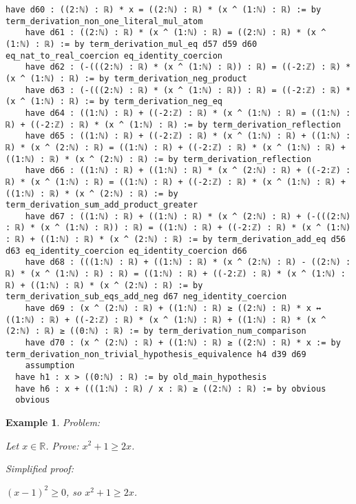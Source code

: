 \documentclass{article}
\newtheorem{example}{Example}
\begin{document}
\begin{tcolorbox}[colback=white!10, width=\linewidth]
\begin{lstlisting}[language=Lean4]
    have d60 : ((2:ℕ) : ℝ) * x = ((2:ℕ) : ℝ) * (x ^ (1:ℕ) : ℝ) := by term_derivation_non_one_literal_mul_atom
    have d61 : ((2:ℕ) : ℝ) * (x ^ (1:ℕ) : ℝ) = ((2:ℕ) : ℝ) * (x ^ (1:ℕ) : ℝ) := by term_derivation_mul_eq d57 d59 d60 eq_nat_to_real_coercion eq_identity_coercion
    have d62 : (-(((2:ℕ) : ℝ) * (x ^ (1:ℕ) : ℝ)) : ℝ) = ((-2:ℤ) : ℝ) * (x ^ (1:ℕ) : ℝ) := by term_derivation_neg_product
    have d63 : (-(((2:ℕ) : ℝ) * (x ^ (1:ℕ) : ℝ)) : ℝ) = ((-2:ℤ) : ℝ) * (x ^ (1:ℕ) : ℝ) := by term_derivation_neg_eq
    have d64 : ((1:ℕ) : ℝ) + ((-2:ℤ) : ℝ) * (x ^ (1:ℕ) : ℝ) = ((1:ℕ) : ℝ) + ((-2:ℤ) : ℝ) * (x ^ (1:ℕ) : ℝ) := by term_derivation_reflection
    have d65 : ((1:ℕ) : ℝ) + ((-2:ℤ) : ℝ) * (x ^ (1:ℕ) : ℝ) + ((1:ℕ) : ℝ) * (x ^ (2:ℕ) : ℝ) = ((1:ℕ) : ℝ) + ((-2:ℤ) : ℝ) * (x ^ (1:ℕ) : ℝ) + ((1:ℕ) : ℝ) * (x ^ (2:ℕ) : ℝ) := by term_derivation_reflection
    have d66 : ((1:ℕ) : ℝ) + ((1:ℕ) : ℝ) * (x ^ (2:ℕ) : ℝ) + ((-2:ℤ) : ℝ) * (x ^ (1:ℕ) : ℝ) = ((1:ℕ) : ℝ) + ((-2:ℤ) : ℝ) * (x ^ (1:ℕ) : ℝ) + ((1:ℕ) : ℝ) * (x ^ (2:ℕ) : ℝ) := by term_derivation_sum_add_product_greater
    have d67 : ((1:ℕ) : ℝ) + ((1:ℕ) : ℝ) * (x ^ (2:ℕ) : ℝ) + (-(((2:ℕ) : ℝ) * (x ^ (1:ℕ) : ℝ)) : ℝ) = ((1:ℕ) : ℝ) + ((-2:ℤ) : ℝ) * (x ^ (1:ℕ) : ℝ) + ((1:ℕ) : ℝ) * (x ^ (2:ℕ) : ℝ) := by term_derivation_add_eq d56 d63 eq_identity_coercion eq_identity_coercion d66
    have d68 : (((1:ℕ) : ℝ) + ((1:ℕ) : ℝ) * (x ^ (2:ℕ) : ℝ) - ((2:ℕ) : ℝ) * (x ^ (1:ℕ) : ℝ) : ℝ) = ((1:ℕ) : ℝ) + ((-2:ℤ) : ℝ) * (x ^ (1:ℕ) : ℝ) + ((1:ℕ) : ℝ) * (x ^ (2:ℕ) : ℝ) := by term_derivation_sub_eqs_add_neg d67 neg_identity_coercion
    have d69 : (x ^ (2:ℕ) : ℝ) + ((1:ℕ) : ℝ) ≥ ((2:ℕ) : ℝ) * x ↔ ((1:ℕ) : ℝ) + ((-2:ℤ) : ℝ) * (x ^ (1:ℕ) : ℝ) + ((1:ℕ) : ℝ) * (x ^ (2:ℕ) : ℝ) ≥ ((0:ℕ) : ℝ) := by term_derivation_num_comparison
    have d70 : (x ^ (2:ℕ) : ℝ) + ((1:ℕ) : ℝ) ≥ ((2:ℕ) : ℝ) * x := by term_derivation_non_trivial_hypothesis_equivalence h4 d39 d69
    assumption
  have h1 : x > ((0:ℕ) : ℝ) := by old_main_hypothesis
  have h6 : x + (((1:ℕ) : ℝ) / x : ℝ) ≥ ((2:ℕ) : ℝ) := by obvious
  obvious

\end{lstlisting}
\end{tcolorbox}


\begin{example}
Problem:
\begin{tcolorbox}[colback=yellow!10, width=\linewidth]
Let $x\in\mathbb{R}$. Prove: $x^2 + 1\ge 2x$.
\end{tcolorbox}

Simplified proof:
\begin{tcolorbox}[colback=blue!10, width=\linewidth]
$(x-1)^2 \ge 0$, so $x^2 + 1 \ge 2x$.
\end{tcolorbox}
\end{example}
\end{document}
